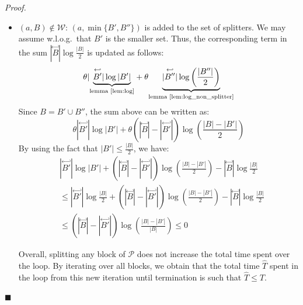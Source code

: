 \documentclass[12pt, a4 paper]{article}
\renewenvironment{proof}[1][Proof]{\begin{mdframed}[backgroundcolor=black!5, topline=false, rightline=false, bottomline=false, linecolor=black!15, linewidth=3pt]{\noindent\textit{#1.}\ }}{\noindent\par\hfill$\blacksquare$\end{mdframed}}
\theoremstyle{definition}
\begin{document}
\begin{proof}
\begin{itemize}
        \item $(a, B) \notin \mathcal{W}$: $(a, \min\{B', B''\})$ is added to the set of splitters. We may assume w.l.o.g.\ that $B'$ is the smaller set. Thus, the corresponding term in the sum $|\overset{\hookleftarrow}{B}| \log \frac{| B |}{2}$ is updated as follows:
        \begin{equation*}
            \theta | \underset{\text{lemma \ref{lem:log}}}{\underbrace{\overset{\hookleftarrow}{B'} | \log | B' |}} + \theta \underset{\text{lemma \ref{lem:log_non_splitter}}}{\underbrace{|\overset{\hookleftarrow}{B''} | \log \left(\frac{| B'' |}{2}\right)}}
        \end{equation*}
        Since $B = B' \cup B''$, the sum above can be written as:
        \begin{equation*}
            \theta | \overset{\hookleftarrow}{B'} | \log | B' | + \theta (| \overset{\hookleftarrow}{B} | - | \overset{\hookleftarrow}{B'} |) \log \left(\frac{|B|-|B'|}{2}\right)
        \end{equation*}
        By using the fact that $\displaystyle{| B' | \leq \frac{|B|}{2}}$, we have:
        \begin{align*}
            & | \overset{\hookleftarrow}{B'} | \log | B'| + (| \overset{\hookleftarrow}{B} | - | \overset{\hookleftarrow}{B'}|)\log \left(\frac{| B | - |B'|}{2} \right) - |\overset{\hookleftarrow}{B}| \log \frac{|B|}{2} \\
            & \leq | \overset{\hookleftarrow}{B'}| \log \frac{| B |}{2} + (| \overset{\hookleftarrow}{B}| - | \overset{\hookleftarrow}{B'}|) \log \left(\frac{|B| - |B'|}{2}\right) - | \overset{\hookleftarrow}{B}| \log \frac{| B |}{2} \\
            & \leq (| \overset{\hookleftarrow}{B}| - | \overset{\hookleftarrow}{B'} |) \log \left(\frac{| B | - | B' |}{| B |}\right) \leq 0
        \end{align*}

        Overall, splitting any block of $\mathcal{P}$ does not increase the total time spent over the loop. By iterating over all blocks, we obtain that the total time $\hat{T}$ spent in the loop from this new iteration until termination is such that $\hat{T} \leq T$.
    \end{itemize}
\end{proof}

\bigskip
\end{document}

